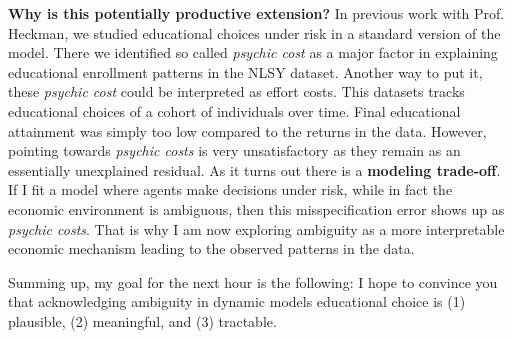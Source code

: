 %
\textbf{Why is this potentially productive extension?} In previous work with Prof. Heckman, we studied educational choices under risk in a standard version of the model. There we identified so called \textit{psychic cost} as a major factor in explaining educational enrollment patterns in the NLSY dataset. Another way to put it, these \textit{psychic cost} could be interpreted as effort costs. This datasets tracks educational choices of a cohort of individuals over time. Final educational attainment was simply too low compared to the returns in the data. However, pointing towards \textit{psychic costs} is very unsatisfactory as they remain as an essentially unexplained residual. As it turns out there is a \textbf{modeling trade-off}. If I fit a model where agents make decisions under risk, while in fact the economic environment is ambiguous, then this misspecification error shows up as \textit{psychic costs}. That is why I am now exploring ambiguity as a more interpretable economic mechanism leading to the observed patterns in the data.

Summing up, my goal for the next hour is the following: I hope to convince you that acknowledging ambiguity in dynamic models educational choice is (1) plausible, (2) meaningful, and (3) tractable.
